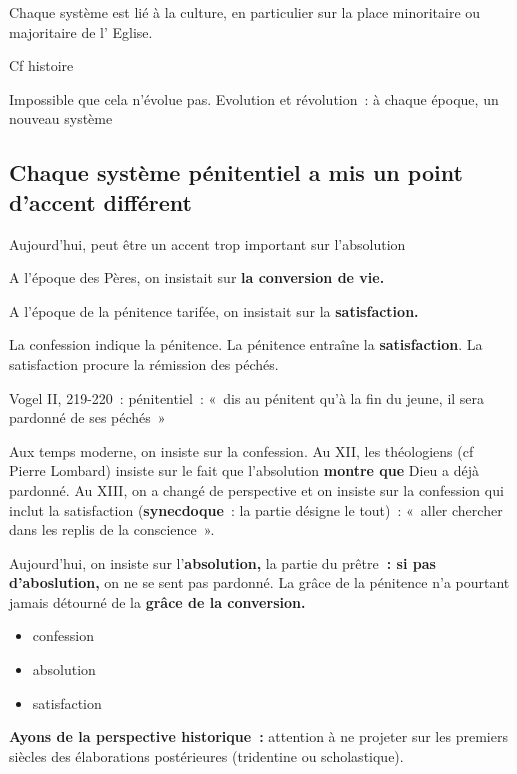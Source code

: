 Chaque système est lié à la culture, en particulier sur la place
minoritaire ou majoritaire de l' Eglise.

Cf histoire

Impossible que cela n'évolue pas.
Evolution et révolution~: à chaque époque, un nouveau système





\hypertarget{chaque-systuxe8me-puxe9nitentiel-a-mis-un-point-daccent-diffuxe9rent}{%
\subsection{Chaque système pénitentiel a mis un point d'accent
différent}\label{chaque-systuxe8me-puxe9nitentiel-a-mis-un-point-daccent-diffuxe9rent}}

Aujourd'hui, peut être un accent trop important sur l'absolution

A l'époque des Pères, on insistait sur \textbf{la conversion de vie.}

A l'époque de la pénitence tarifée, on insistait sur la
\textbf{satisfaction.}

La confession indique la pénitence. La pénitence entraîne la
\textbf{satisfaction}. La satisfaction procure la rémission des péchés.

Vogel II, 219-220~: pénitentiel~: «~dis au pénitent qu'à la fin du
jeune, il sera pardonné de ses péchés~»

Aux temps moderne, on insiste sur la confession. Au XII, les théologiens
(cf Pierre Lombard) insiste sur le fait que l'absolution \textbf{montre
que} Dieu a déjà pardonné. Au XIII, on a changé de perspective et on
insiste sur la confession qui inclut la satisfaction
(\textbf{synecdoque}~: la partie désigne le tout)~: «~aller chercher
dans les replis de la conscience~».

Aujourd'hui, on insiste sur l'\textbf{absolution,} la partie du
prêtre\textbf{~: si pas d'aboslution,} on ne se sent pas pardonné. La
grâce de la pénitence n'a pourtant jamais détourné de la \textbf{grâce
de la conversion.}

\begin{itemize}
\item
  confession
\item
  absolution
\item
  satisfaction
\end{itemize}

\textbf{Ayons de la perspective historique~:} attention à ne projeter
sur les premiers siècles des élaborations postérieures (tridentine ou
scholastique).

